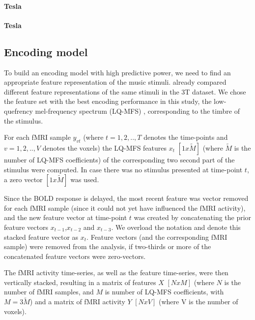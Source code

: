 \paragraph{\unit[3]{Tesla}}
\paragraph{\unit[7]{Tesla}}

\subsection*{Encoding model}


To build an encoding model with high predictive power, we need to find an
appropriate feature representation of the music stimuli.  \cite{CTK+2012}
already compared different feature representations of the same stimuli in the
3T dataset. We chose the feature set with the best encoding performance in this
study, the low-quefrency mel-frequency spectrum (LQ-MFS) \cite{HDH+2015},
corresponding to the timbre of the stimulus. 




For each f{MRI} sample $y_{vt}$ (where $t=1,2,..,T$ denotes the time-points and
$v=1,2,..,V$ denotes the voxels) the LQ-MFS features $x_{t}$
$[1x\widetilde{M}]$ (where $\widetilde{M}$ is the number of LQ-MFS
coefficients) of the corresponding two second part of the stimulus were
computed. In case there was no stimulus presented at time-point $t$, a zero
vector $[1x\widetilde{M}]$ was used. 

Since the BOLD response is delayed,  the most recent feature was vector removed
for each f{MRI} sample (since it could not yet have influenced the f{MRI}
activity), and the new feature vector at time-point $t$ was created by
concatenating the prior feature vectors $x_{t-1}$,$x_{t-2}$ and $x_{t-3}$. We
overload the notation and denote this stacked feature vector as $x_{t}$.
Feature vectors (and the corresponding f{MRI} sample) were removed from the
analysis, if two-thirds or more of the concatenated feature vectors were
zero-vectors.

The f{MRI} activity time-series, as well as the feature time-series, were then
vertically stacked, resulting in a matrix of features $X$ $[NxM]$ (where $N$ is
the number of f{MRI} samples, and $M$ is number of LQ-MFS coefficients, with
$M=3\widetilde{M}$) and a matrix of f{MRI} activity $Y$ $[NxV]$ (where V is the
number of voxels).

